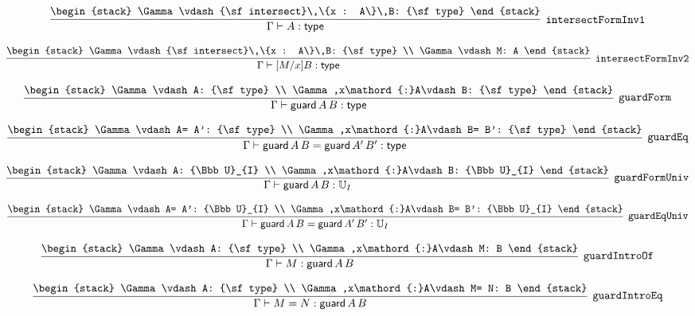 \[
\infer[{\tt intersectFormInv1}]{\Gamma \vdash A: {\sf type}}{
\begin{stack}
\Gamma \vdash {\sf intersect}\,\{x : A\}\,B: {\sf type}
\end{stack}}
\]

\[
\infer[{\tt intersectFormInv2}]{\Gamma \vdash [M/x]B: {\sf type}}{
\begin{stack}
\Gamma \vdash {\sf intersect}\,\{x : A\}\,B: {\sf type}
\\
\Gamma \vdash M: A
\end{stack}}
\]

\[
\infer[{\tt guardForm}]{\Gamma \vdash {\sf guard}\,A\,B: {\sf type}}{
\begin{stack}
\Gamma \vdash A: {\sf type}
\\
\Gamma ,x\mathord{:}A\vdash B: {\sf type}
\end{stack}}
\]

\[
\infer[{\tt guardEq}]{\Gamma \vdash {\sf guard}\,A\,B= {\sf guard}\,A'\,B': {\sf type}}{
\begin{stack}
\Gamma \vdash A= A': {\sf type}
\\
\Gamma ,x\mathord{:}A\vdash B= B': {\sf type}
\end{stack}}
\]

\[
\infer[{\tt guardFormUniv}]{\Gamma \vdash {\sf guard}\,A\,B: {\Bbb U}_{I}}{
\begin{stack}
\Gamma \vdash A: {\Bbb U}_{I}
\\
\Gamma ,x\mathord{:}A\vdash B: {\Bbb U}_{I}
\end{stack}}
\]

\[
\infer[{\tt guardEqUniv}]{\Gamma \vdash {\sf guard}\,A\,B= {\sf guard}\,A'\,B': {\Bbb U}_{I}}{
\begin{stack}
\Gamma \vdash A= A': {\Bbb U}_{I}
\\
\Gamma ,x\mathord{:}A\vdash B= B': {\Bbb U}_{I}
\end{stack}}
\]

\[
\infer[{\tt guardIntroOf}]{\Gamma \vdash M: {\sf guard}\,A\,B}{
\begin{stack}
\Gamma \vdash A: {\sf type}
\\
\Gamma ,x\mathord{:}A\vdash M: B
\end{stack}}
\]

\[
\infer[{\tt guardIntroEq}]{\Gamma \vdash M= N: {\sf guard}\,A\,B}{
\begin{stack}
\Gamma \vdash A: {\sf type}
\\
\Gamma ,x\mathord{:}A\vdash M= N: B
\end{stack}}
\]

